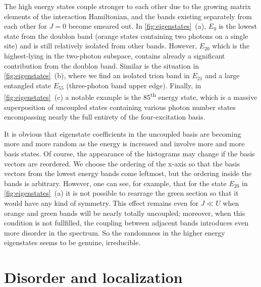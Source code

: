 \documentclass[%
 aps, pra,
 amsmath,amssymb,
 reprint,%
superscriptaddress
]{revtex4-2}
\begin{document}
The high energy states couple stronger to each other due to the growing matrix elements of the interaction Hamiltonian, and the bands existing separately from each other for $J=0$ become smeared out.  In \autoref{fig:eigenstates}~(a), $E_9$ is the lowest state from the doublon band (orange states containing two photons on a single site) and is still relatively isolated from other bands. However, $E_{20}$ which is the highest-lying in the two-photon subspace, contains already a significant contribution from the doublon band. Similar is the situation in \autoref{fig:eigenstates}~(b), where we find an isolated trion band in $E_{21}$ and a large entangled state $E_{55}$ (three-photon band upper edge). Finally, in \autoref{fig:eigenstates}~(c) a notable example is the 85\textsuperscript{th} energy state, which is a massive superposition of uncoupled states containing various photon number states encompassing nearly the full entirety of the four-excitation basis. 

It is obvious that eigenstate coefficients in the uncoupled basis are becoming more and more random as the energy is increased and involve more and more basis states. Of course, the appearance of the histograms may change if the basis vectors are reordered. We choose the ordering of the x-axis so that the basis vectors from the lowest energy bands come leftmost, but the ordering inside the bands is arbitrary. However, one can see, for example, that for the state $E_{20}$ in \autoref{fig:eigenstates}~(a) it is not possible to rearrage the green section so that it would have any kind of symmetry. This effect remains even for $J\ll U$ when orange and green bands will be nearly totally uncoupled; moreover, when this condition is not fullfilled, the coupling between adjacent bands introduces even more disorder in the spectrum. So the randomness in the higher energy eigenstates seems to be genuine, irreducible.


\section{Disorder and localization}
\end{document}

